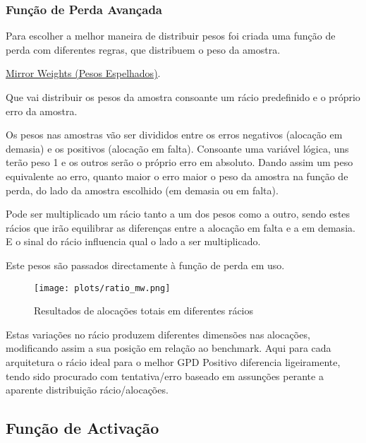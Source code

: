 

\subsubsection{Função de Perda Avançada}\label{se:advancedloss}

Para escolher a melhor maneira de distribuir pesos foi criada uma função de perda com diferentes regras, que distribuem o peso da amostra.\par
\href{https://github.com/alquimodelia/alquitable/blob/main/alquitable/advanced_losses.py#L33}{Mirror Weights (Pesos Espelhados)}.\par
Que vai distribuir os pesos da amostra consoante um rácio predefinido e o próprio erro da amostra.\par
Os pesos nas amostras vão ser divididos entre os erros negativos (alocação em demasia) e os positivos (alocação em falta). Consoante uma variável lógica,  uns terão peso 1 e os outros serão o próprio erro em absoluto. Dando assim um peso equivalente ao erro, quanto maior o erro maior o peso da amostra na função de perda, do lado da amostra escolhido (em demasia ou em falta).\par
Pode ser multiplicado um rácio tanto a um dos pesos como a outro, sendo estes rácios que irão equilibrar as diferenças entre a alocação em falta e a em demasia. E o sinal do rácio influencia qual o lado a ser multiplicado.\par
Este pesos são passados directamente à função de perda em uso.\par


\begin{figure}[H]
    \centering
    \texttt{[image: plots/ratio\_mw.png]}
    \caption{Resultados de alocações totais em diferentes rácios}
    \label{fig:resexpratiomw}
  \end{figure}

Estas variações no rácio produzem diferentes dimensões nas alocações, modificando assim a sua posição em relação ao benchmark. Aqui para cada arquitetura o rácio ideal para o melhor GPD Positivo diferencia ligeiramente, tendo sido procurado com tentativa/erro baseado em assunções perante a aparente distribuição rácio/alocações.\par


\subsection{Função de Activação}


